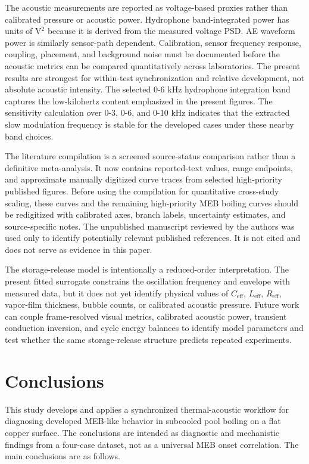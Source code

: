 \documentclass[final,1p,times]{elsarticle}
\begin{document}
The acoustic measurements are reported as voltage-based proxies rather than calibrated pressure or acoustic power. Hydrophone band-integrated power has units of V$^2$ because it is derived from the measured voltage PSD. AE waveform power is similarly sensor-path dependent. Calibration, sensor frequency response, coupling, placement, and background noise must be documented before the acoustic metrics can be compared quantitatively across laboratories. The present results are strongest for within-test synchronization and relative development, not absolute acoustic intensity. The selected 0-6 kHz hydrophone integration band captures the low-kilohertz content emphasized in the present figures. The sensitivity calculation over 0-3, 0-6, and 0-10 kHz indicates that the extracted slow modulation frequency is stable for the developed cases under these nearby band choices.

The literature compilation is a screened source-status comparison rather than a definitive meta-analysis. It now contains reported-text values, range endpoints, and approximate manually digitized curve traces from selected high-priority published figures. Before using the compilation for quantitative cross-study scaling, these curves and the remaining high-priority MEB boiling curves should be redigitized with calibrated axes, branch labels, uncertainty estimates, and source-specific notes. The unpublished manuscript reviewed by the authors was used only to identify potentially relevant published references. It is not cited and does not serve as evidence in this paper.

The storage-release model is intentionally a reduced-order interpretation. The present fitted surrogate constrains the oscillation frequency and envelope with measured data, but it does not yet identify physical values of $C_{\mathrm{eff}}$, $L_{\mathrm{eff}}$, $R_{\mathrm{eff}}$, vapor-film thickness, bubble counts, or calibrated acoustic pressure. Future work can couple frame-resolved visual metrics, calibrated acoustic power, transient conduction inversion, and cycle energy balances to identify model parameters and test whether the same storage-release structure predicts repeated experiments.

\section{Conclusions}

This study develops and applies a synchronized thermal-acoustic workflow for diagnosing developed MEB-like behavior in subcooled pool boiling on a flat copper surface. The conclusions are intended as diagnostic and mechanistic findings from a four-case dataset, not as a universal MEB onset correlation. The main conclusions are as follows.
\end{document}
